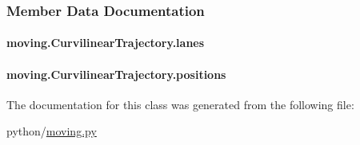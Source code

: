 \subsubsection{Member Data Documentation}
\hypertarget{classmoving_1_1CurvilinearTrajectory_a5ac59449b964d1a3907235bf6477ac52}{
\paragraph[{lanes}]{\setlength{\rightskip}{0pt plus 5cm}moving.\-Curvilinear\-Trajectory.\-lanes}}\label{classmoving_1_1CurvilinearTrajectory_a5ac59449b964d1a3907235bf6477ac52}
\hypertarget{classmoving_1_1CurvilinearTrajectory_a165e6d95288f037dcdb94c04646d1952}{
\paragraph[{positions}]{\setlength{\rightskip}{0pt plus 5cm}moving.\-Curvilinear\-Trajectory.\-positions}}\label{classmoving_1_1CurvilinearTrajectory_a165e6d95288f037dcdb94c04646d1952}


The documentation for this class was generated from the following file\-:\begin{DoxyCompactItemize}
\item 
python/\hyperlink{moving_8py}{moving.\-py}\end{DoxyCompactItemize}
